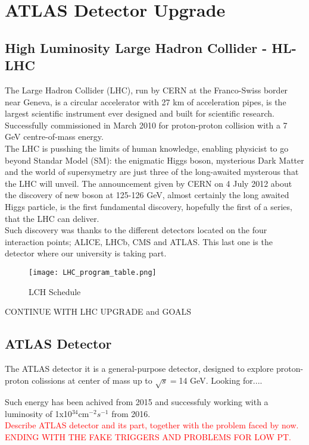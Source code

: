 \section{ATLAS Detector Upgrade}

\subsection{High Luminosity Large Hadron Collider - HL-LHC}
The Large Hadron Collider (LHC), run by CERN at the Franco-Swiss border near Geneva, is a circular accelerator with 27 km of acceleration pipes, is
the largest scientific instrument ever designed and built for scientific research. Successfully commissioned in March 2010 for proton-proton collision
with a 7 GeV centre-of-mass energy.\\ The LHC is pusshing the limits of human knowledge, enabling physicist to go beyond Standar Model (SM): the
enigmatic Higgs boson, mysterious Dark Matter and the world of supersymetry are just three of the long-awaited mysterous that the LHC will unveil. The
announcement given by CERN on 4 July 2012 about the discovery of new boson at 125-126 GeV, almost certainly the long awaited Higgs particle, is the
first fundamental discovery, hopefully the first of a series, that the LHC can deliver.\\ Such discovery was thanks to the different detectors located
on the four interaction points; ALICE, LHCb, CMS and ATLAS. This last one is the detector where our university is taking part.\par
\begin{figure}[ht]
		\centering
		\texttt{[image: LHC\_program\_table.png]}
		\caption{LCH Schedule}\label{fig:a}
\end{figure}
\par
CONTINUE WITH LHC UPGRADE and GOALS

\subsection{ATLAS Detector}
The ATLAS detector it is a general-purpose detector, designed to explore proton-proton colissions at center of mass up to $\sqrt{s}=$14 GeV. Looking for.... \par
Such energy has been achived from 2015 and successfuly working with a luminosity of 1x10$^{34}$cm$^{-2}s^{-1}$ from 2016.\\

\textcolor{red}{Describe ATLAS detector and its part, together with the problem faced by now.
ENDING WITH THE FAKE TRIGGERS AND PROBLEMS FOR LOW PT.}



